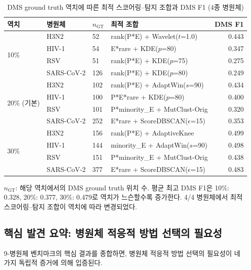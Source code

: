 \begin{table}[htbp]
\centering
\caption{DMS ground truth 역치에 따른 최적 스코어링--탐지 조합과 DMS F1 (4종 병원체)}
\label{tab:dms_threshold_sensitivity}
\small
\begin{tabular}{llllr}
\toprule
\textbf{역치} & \textbf{병원체} & \textbf{$n_{\text{GT}}$} & \textbf{최적 조합} & \textbf{DMS F1} \\
\midrule
\multirow{4}{*}{10\%}
& H3N2 & 52 & rank(P*E) + Wavelet($t$=1.0) & 0.443 \\
& HIV-1 & 54 & E*rare + KDE($p$=80) & 0.347 \\
& RSV & 51 & rank(P*E) + KDE($p$=75) & 0.275 \\
& SARS-CoV-2 & 126 & rank(P*E) + KDE($p$=80) & 0.249 \\
\midrule
\multirow{4}{*}{20\% (기본)}
& H3N2 & 102 & rank(P*E) + AdaptWin($s$=90) & 0.434 \\
& HIV-1 & 100 & P*E*rare + KDE($p$=80) & 0.400 \\
& RSV & 101 & P*minority\_E + MutClust-Orig & 0.320 \\
& SARS-CoV-2 & 252 & E*rare + ScoreDBSCAN($\epsilon$=15) & 0.353 \\
\midrule
\multirow{4}{*}{30\%}
& H3N2 & 156 & rank(P*E) + AdaptiveKnee & 0.499 \\
& HIV-1 & 144 & minority\_E + AdaptWin($s$=90) & 0.498 \\
& RSV & 151 & P*minority\_E + MutClust-Orig & 0.438 \\
& SARS-CoV-2 & 377 & E*rare + ScoreDBSCAN($\epsilon$=15) & 0.483 \\
\bottomrule
\end{tabular}
\begin{minipage}{\textwidth}
\smallskip
\footnotesize $n_{\text{GT}}$: 해당 역치에서의 DMS ground truth 위치 수. 평균 최고 DMS F1은 10\%: 0.328, 20\%: 0.377, 30\%: 0.479로 역치가 느슨할수록 증가한다. 4/4 병원체에서 최적 스코어링--탐지 조합이 역치에 따라 변경되었다.
\end{minipage}
\end{table}



\subsection{핵심 발견 요약: 병원체 적응적 방법 선택의 필요성}
\label{subsec:pahd_motivation_summary}


9-병원체 벤치마크의 핵심 결과를 종합하면, 병원체 적응적 방법 선택의 필요성이 네 가지 독립적 증거에 의해 입증된다.

